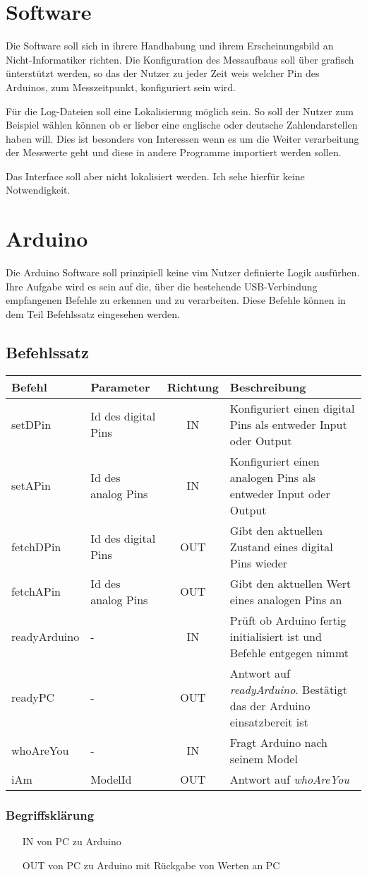 \section {Software}
Die Software soll sich in ihrere Handhabung und ihrem Erscheinungsbild an
Nicht-Informatiker richten. Die Konfiguration des Messaufbaus soll über
grafisch ünterstützt werden, so das der Nutzer zu jeder Zeit weis welcher Pin
des Arduinos, zum Messzeitpunkt, konfiguriert sein wird.

Für die Log-Dateien soll eine Lokalisierung möglich sein. So soll der Nutzer zum
Beispiel wählen können ob er lieber eine englische oder deutsche
Zahlendarstellen haben will. Dies ist besonders von Interessen wenn es um die
Weiter verarbeitung der Messwerte geht und diese in andere Programme importiert
werden sollen.

Das Interface soll aber nicht lokalisiert werden. Ich sehe hierfür keine
Notwendigkeit.

\section {Arduino}
Die Arduino Software soll prinzipiell keine vim Nutzer definierte Logik
ausfürhen. Ihre Aufgabe wird es sein auf die, über die bestehende
USB-Verbindung empfangenen Befehle zu erkennen und zu verarbeiten. Diese
Befehle können in dem Teil Befehlssatz eingesehen werden.
\subsection{Befehlssatz}
\begin{tabular}{l|l|c|l}
\textbf{Befehl}&\textbf{Parameter}& 
\textbf{Richtung}&\textbf{Beschreibung}\\\hline
setDPin&Id des digital Pins&IN&Konfiguriert einen digital Pins als entweder
Input oder Output\\
setAPin&Id des analog Pins&IN&Konfiguriert einen analogen Pins als entweder
Input oder Output\\
fetchDPin&Id des digital Pins&OUT&Gibt den aktuellen Zustand eines digital Pins
wieder\\
fetchAPin&Id des analog Pins&OUT&Gibt den aktuellen Wert eines analogen Pins
an\\
readyArduino& - &IN&Prüft ob Arduino fertig initialisiert ist und Befehle 
entgegen nimmt\\
readyPC& - &OUT&Antwort auf \textit{readyArduino}. Bestätigt das der Arduino 
einsatzbereit ist\\
whoAreYou& - &IN&Fragt Arduino nach seinem Model\\
iAm& ModelId &OUT&Antwort auf \textit{whoAreYou}\\
\end{tabular}

\subsubsection{Begriffsklärung}
\begin{itemize}
 \item[IN] von PC zu Arduino
 \item[OUT] von PC zu Arduino mit Rückgabe von Werten an PC
\end{itemize}

